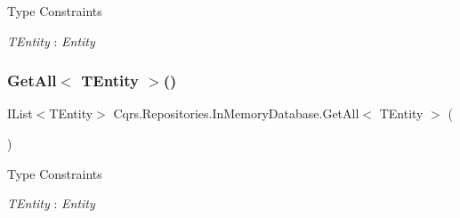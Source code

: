 \begin{Desc}
\item[Type Constraints]\begin{description}
\item[{\em T\+Entity} : {\em Entity}]\end{description}
\end{Desc}
\mbox{\label{classCqrs_1_1Repositories_1_1InMemoryDatabase_a83104b325c203f6768bb8ffd2c9c3381_a83104b325c203f6768bb8ffd2c9c3381}} 
\subsubsection{\texorpdfstring{Get\+All$<$ T\+Entity $>$()}{GetAll< TEntity >()}}
{\footnotesize\ttfamily I\+List$<$T\+Entity$>$ Cqrs.\+Repositories.\+In\+Memory\+Database.\+Get\+All$<$ T\+Entity $>$ (\begin{DoxyParamCaption}{ }\end{DoxyParamCaption})}

\begin{Desc}
\item[Type Constraints]\begin{description}
\item[{\em T\+Entity} : {\em Entity}]\end{description}
\end{Desc}
